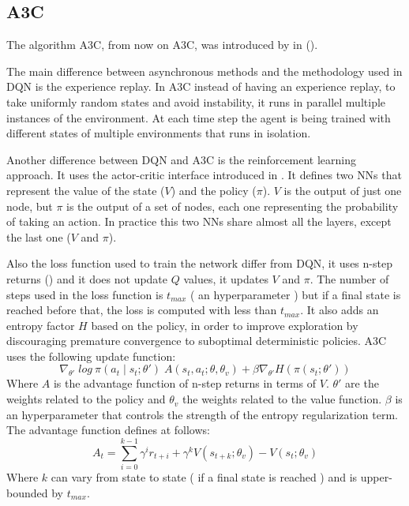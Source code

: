 \subsection{\acl{A3C}\label{subsec:A3C}}
The algorithm \acl{A3C}, from now on \ac{A3C}, was introduced by \citeauthor{mnih2016A3C} in
 (\citeyear{mnih2016A3C}).

The main difference between asynchronous methods and the methodology used in \ac{DQN} is the experience replay.
In \ac{A3C} instead of having an experience replay, to take uniformly random states and avoid instability, it runs in
parallel multiple instances of the environment.
At each time step the agent is being trained with different states of multiple environments that runs in isolation.

Another difference between \ac{DQN} and \ac{A3C} is the reinforcement learning approach.
It uses the actor-critic interface introduced in .
It defines two \acp{NN} that represent the value of the state ($V$) and the policy ($\pi$).
$V$ is the output of just one node, but $\pi$ is the output of a set of nodes, each one representing the probability of taking
an action.
In practice this two \acp{NN} share almost all the layers, except the last one ($V$ and $\pi$).

Also the loss function used to train the network differ from \ac{DQN}, it uses n-step returns () and it does not
update $Q$ values, it updates $V$ and $\pi$.
The number of steps used in the loss function is $t_{max}$ ( an hyperparameter ) but if a
final state is reached before that, the loss is computed with less than $t_{max}$.
It also adds an entropy factor $H$ based on the policy, in order to improve exploration by discouraging premature
convergence to suboptimal deterministic policies.
\ac{A3C} uses the following update function:
\begin{equation}
    \nabla_{\theta'}\;log\:\pi(a_t\mid s_t;\theta')\;A(s_t,a_t;\theta,\theta_v)+\beta\nabla_{\theta'}H(\pi(s_t;\theta'))
\end{equation}
Where $A$ is the advantage function of n-step returns in terms of $V$.
$\theta'$ are the weights related to the policy and $\theta_v$ the weights related to the value function.
$\beta$ is an hyperparameter that controls the strength of the entropy regularization term.
The advantage function defines at follows:
\begin{equation}
    A_t=\sum^{k-1}_{i=0}\gamma^i r_{t+i}+\gamma^k V(s_{t+k};\theta_v)-V(s_t;\theta_v)
\end{equation}
Where $k$ can vary from state to state ( if a final state is reached ) and is upper-bounded by $t_{max}$.

